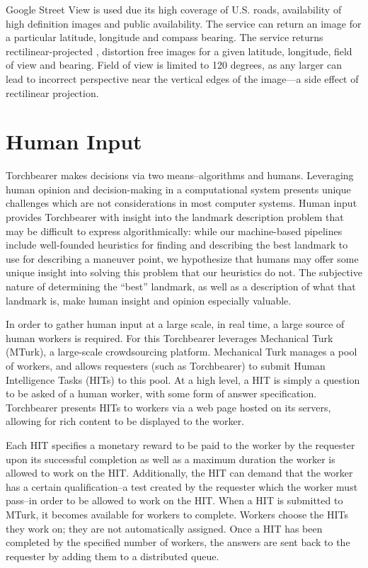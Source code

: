 Google Street View is used due its high coverage of U.S. roads, availability of high definition images and public availability. The service can return an image for a particular latitude, longitude and compass bearing. The service returns rectilinear-projected \cite{agarwal2015metric}, distortion free images for a given latitude, longitude, field of view and bearing. Field of view is limited to 120 degrees, as any larger can lead to incorrect perspective near the vertical edges of the image---a side effect of rectilinear projection.
 
\section{Human Input}
Torchbearer makes decisions via two means--algorithms and humans. Leveraging human opinion and decision-making in a computational system presents unique challenges which are not considerations in most computer systems. Human input provides Torchbearer with insight into the landmark description problem that may be difficult to express algorithmically: while our machine-based pipelines include well-founded heuristics for finding and describing the best landmark to use for describing a maneuver point, we hypothesize that humans may offer some unique insight into solving this problem that our heuristics do not. The subjective nature of determining the “best” landmark, as well as a description of what that landmark is, make human insight and opinion especially valuable. 

In order to gather human input at a large scale, in real time, a large source of human workers is required. For this Torchbearer leverages Mechanical Turk (MTurk), a large-scale crowdsourcing platform. Mechanical Turk manages a pool of workers, and allows requesters (such as Torchbearer) to submit Human Intelligence Tasks (HITs) to this pool. At a high level, a HIT is simply a question to be asked of a human worker, with some form of answer specification. Torchbearer presents HITs to workers via a web page hosted on its servers, allowing for rich content to be displayed to the worker.

Each HIT specifies a monetary reward to be paid to the worker by the requester upon its successful completion as well as a maximum duration the worker is allowed to work on the HIT. Additionally, the HIT can demand that the worker has a certain qualification--a test created by the requester which the worker must pass--in order to be allowed to work on the HIT.  When a HIT is submitted to MTurk, it becomes available for workers to complete. Workers choose the HITs they work on; they are not automatically assigned. Once a HIT has been completed by the specified number of workers, the answers are sent back to the requester by adding them to a distributed queue.

